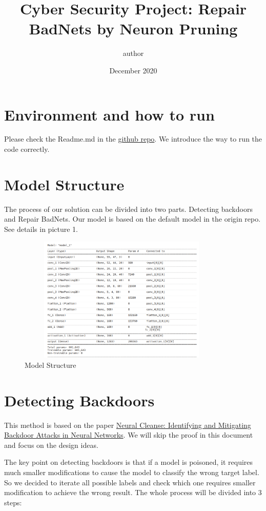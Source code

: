 \documentclass{article}
\title{Cyber Security Project: Repair BadNets by Neuron Pruning}
\author{author}
\date{December 2020}
\begin{document}
\maketitle

\section{Environment and how to run}
Please check the Readme.md in the  \href{https://github.com/zjzsliyang/CSAW-HackML-2020}{github repo}. We introduce the way to run the code correctly.

\section{Model Structure}
    The process of our solution can be divided into two parts. Detecting backdoors and Repair BadNets.
    Our model is based on the default model in the origin repo. See details in picture 1. 
\begin{figure}
    \centering
    \includegraphics[width=10cm,  height=6cm]{"model_structure.png"}
    \caption{Model Structure}
    \label{fig:my_label}
\end{figure}

\section{Detecting Backdoors}
This method is based on the paper \href{https://sites.cs.ucsb.edu/~bolunwang/assets/docs/backdoor-sp19.pdf}{Neural Cleanse: Identifying and Mitigating
Backdoor Attacks in Neural Networks}. We will skip the proof in this document and focus on the design ideas. 

The key point on detecting backdoors is that if a model is poisoned, it requires much smaller modifications to cause the model to classify the wrong target label. So we decided to iterate all possible labels and check which one requires smaller modification to achieve the wrong result. The whole process will be divided into 3 steps: 
\end{document}
